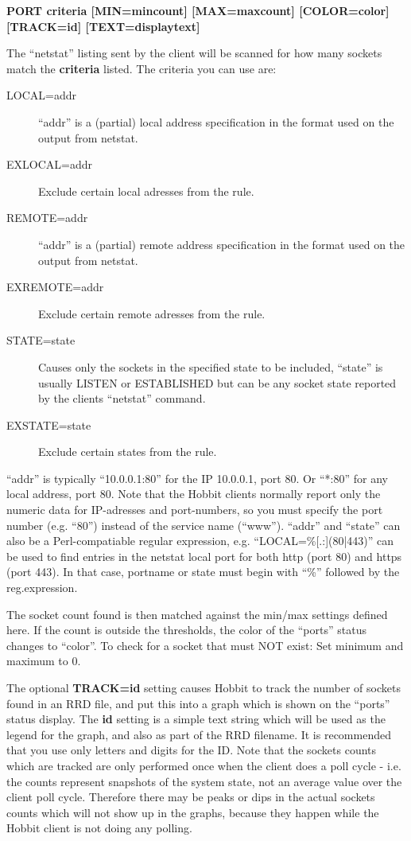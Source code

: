  \textbf{PORT criteria [MIN=mincount] [MAX=maxcount] [COLOR=color] [TRACK=id] [TEXT=displaytext]}



  The ``netstat'' listing sent by the client will be scanned for how many sockets match the \textbf{criteria}
 listed. The criteria you can use are: \begin{description}
\item[LOCAL=addr] ``addr'' is a (partial) local address specification in the format used on the output from netstat. 
\item[EXLOCAL=addr] Exclude certain local adresses from the rule. 
\item[REMOTE=addr] ``addr'' is a (partial) remote address specification in the format used on the output from netstat. 
\item[EXREMOTE=addr] Exclude certain remote adresses from the rule. 
\item[STATE=state] Causes only the sockets in the specified state to be included, ``state'' is usually LISTEN or ESTABLISHED but can be any socket state reported by the clients ``netstat'' command. 
\item[EXSTATE=state] Exclude certain states from the rule. 

\end{description}



  ``addr'' is typically ``10.0.0.1:80'' for the IP 10.0.0.1, port 80. Or ``*:80'' for any local address, port 80. Note that the Hobbit clients normally report only the numeric data for IP-adresses and port-numbers, so you must specify the port number (e.g. ``80'') instead of the service name (``www'').  
 ``addr'' and ``state'' can also be a Perl-compatiable regular expression, e.g. ``LOCAL=\%[.:](80|443)'' can be used to find entries in the netstat local port for both http (port 80) and https (port 443). In that case, portname or state must begin with ``\%'' followed by the reg.expression. 


  The socket count found is then matched against the min/max settings defined here. If the count is outside the thresholds, the color of the ``ports'' status changes to ``color''. To check for a socket that must NOT exist: Set minimum and maximum to 0. 


  The optional \textbf{TRACK=id}
 setting causes Hobbit to track the number of sockets found in an RRD file, and put this into a graph which is shown on the ``ports'' status display. The \textbf{id}
 setting is a simple text string which will be used as the legend for the graph, and also as part of the RRD filename. It is recommended that you use only letters and digits for the ID.  
 Note that the sockets counts which are tracked are only performed once when the client does a poll cycle - i.e. the counts represent snapshots of the system state, not an average value over the client poll cycle. Therefore there may be peaks or dips in the actual sockets counts which will not show up in the graphs, because they happen while the Hobbit client is not doing any polling. 


